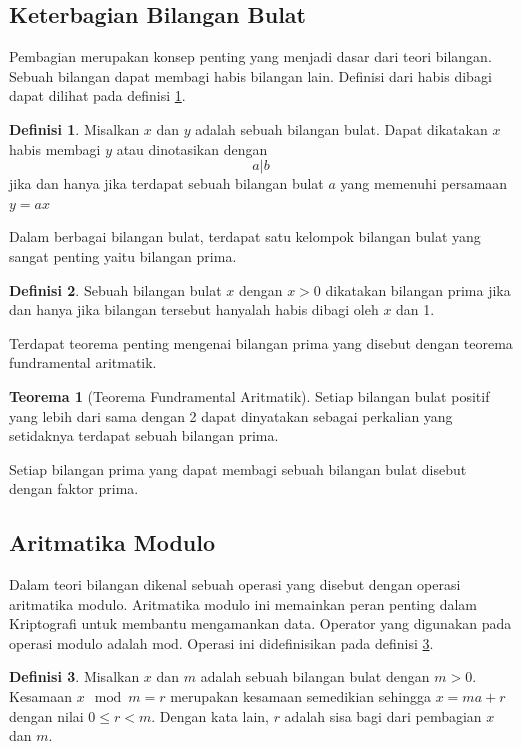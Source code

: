 \documentclass[10pt,conference]{IEEEtran}
\theoremstyle{definition}
\newtheorem{definition}{Definisi}[section]
\newtheorem{theorem}{Teorema}[section]
\begin{document}
\subsection{Keterbagian Bilangan Bulat}
Pembagian merupakan konsep penting yang menjadi dasar dari teori bilangan. Sebuah bilangan dapat membagi habis bilangan lain. Definisi dari habis dibagi dapat dilihat pada
definisi \ref{def:divided}.

\begin{definition} \label{def:divided}
    Misalkan $x$ dan $y$ adalah sebuah bilangan bulat. Dapat dikatakan $x$ habis membagi $y$ atau dinotasikan dengan
    $$ a | b $$
    jika dan hanya jika terdapat sebuah bilangan bulat $a$ yang memenuhi persamaan $ y = ax $
\end{definition}

Dalam berbagai bilangan bulat, terdapat satu kelompok bilangan bulat  yang sangat penting yaitu bilangan prima.
\begin{definition} \label{def:prime}
    Sebuah bilangan bulat $x$ dengan $x > 0$ dikatakan bilangan prima jika dan hanya jika bilangan tersebut hanyalah habis dibagi oleh $x$ dan 1.
\end{definition}

Terdapat teorema penting mengenai bilangan prima yang disebut dengan teorema fundramental aritmatik. \cite{b2}

\begin{theorem}[Teorema Fundramental Aritmatik]
    Setiap bilangan bulat positif yang lebih dari sama dengan 2 dapat dinyatakan sebagai perkalian yang setidaknya terdapat sebuah bilangan prima. 
\end{theorem}

Setiap bilangan prima yang dapat membagi sebuah bilangan bulat disebut dengan faktor prima.

\subsection{Aritmatika Modulo}
Dalam teori bilangan dikenal sebuah operasi yang disebut dengan operasi aritmatika modulo. Aritmatika modulo ini memainkan peran penting dalam Kriptografi untuk membantu
mengamankan data. Operator yang digunakan pada operasi modulo adalah $ \text{mod} $. Operasi ini didefinisikan pada definisi \ref{def:modulo}.

\begin{definition} \label{def:modulo}
    Misalkan $x$ dan $m$ adalah sebuah bilangan bulat dengan $ m > 0 $. Kesamaan $ x \mod{m} = r $ merupakan kesamaan semedikian sehingga $ x = ma + r $ dengan nilai $0 \le r < m$.
    Dengan kata lain, $r$ adalah sisa bagi dari pembagian $x$ dan $m$.
\end{definition}
\end{document}
